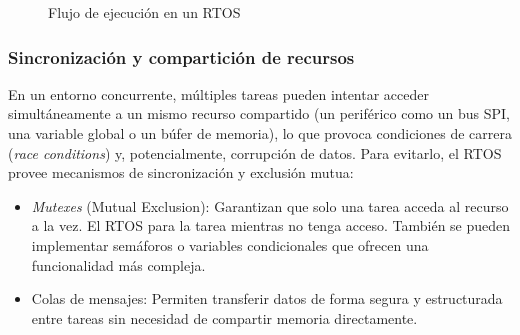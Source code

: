 \documentclass[../main.tex]{subfiles}
\begin{document}
\begin{figure}
                \caption{Flujo de ejecución en un RTOS}
                \label{fig:rtosflow}
            
            \end{figure}


        \subsubsection{Sincronización y compartición de recursos}
            En un entorno concurrente, múltiples tareas pueden intentar acceder simultáneamente a un mismo recurso compartido (un periférico como un bus SPI, una variable global o un búfer de memoria), lo que provoca condiciones de carrera (\emph{race conditions}) y, potencialmente, corrupción de datos. Para evitarlo, el RTOS provee mecanismos de sincronización y exclusión mutua:

            \begin{itemize}
                \item \emph{Mutexes} (Mutual Exclusion): Garantizan que solo una tarea acceda al recurso a la vez. El RTOS para la tarea mientras no tenga acceso. También se pueden implementar semáforos o variables condicionales que ofrecen una funcionalidad más compleja.
                \item Colas de mensajes: Permiten transferir datos de forma segura y estructurada entre tareas sin necesidad de compartir memoria directamente.
            \end{itemize}
\end{document}

